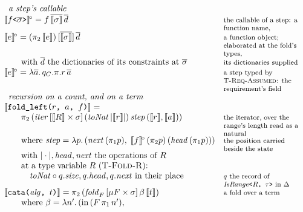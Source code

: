 \begin{figure}[htbp]
\[
\begin{array}{@{}l@{\quad}l@{}}
\multicolumn{2}{l}{\textit{a step's callable}} \\
\llbracket f\texttt{<}\overline{\sigma}\texttt{>} \rrbracket^{\!\circ} = f\,\overline{\llbracket \sigma \rrbracket}\,\overline{d} & \note{the callable of a step: a function name,} \\
\llbracket e \rrbracket^{\!\circ} = (\pi_2\,\llbracket e \rrbracket)\,[\overline{\llbracket \sigma \rrbracket}]\,\overline{d} & \note{a function object; elaborated at the fold's types,} \\
\qquad \text{with } \overline{d} \text{ the dictionaries of its constraints at } \overline{\sigma} & \note{its dictionaries supplied} \\
\llbracket e \rrbracket^{\!\circ} = \lambda\overline{a}.\,q_C.\pi.r\,\overline{a} & \note{a step typed by \textsc{T-Req-Assumed}: the requirement's field} \\
\multicolumn{2}{l}{\textit{recursion on a count, and on a term}} \\
\llbracket \texttt{fold\_left(}r\texttt{, }a\texttt{, }f\texttt{)} \rrbracket = {} & \\
\qquad \pi_2\,(\mathit{iter}\,[\llbracket R \rrbracket \times \sigma]\,(\mathit{toNat}\,|\llbracket r \rrbracket|)\,\mathit{step}\,(\llbracket r \rrbracket, \llbracket a \rrbracket)) & \note{the iterator, over the range's length read as a natural} \\
\qquad \text{where } \mathit{step} = \lambda p.\,(\mathit{next}\,(\pi_1 p),\; \llbracket f \rrbracket^{\!\circ}\,(\pi_2 p)\,(\mathit{head}\,(\pi_1 p))) & \note{the position carried beside the state} \\
\qquad \text{with } |\cdot|, \mathit{head}, \mathit{next} \text{ the operations of } R & \\
\qquad \text{at a type variable } R \text{ (\textsc{T-Fold-R}):} & \\
\qquad\quad \mathit{toNat} \circ q.\mathit{size}, q.\mathit{head}, q.\mathit{next} \text{ in their place} & \note{$q$  the record of $\mathit{IsRange}\texttt{<}R\texttt{, }\tau\texttt{>}$  in $\Delta$} \\
\llbracket \texttt{cata(}\mathit{alg}\texttt{, }t\texttt{)} \rrbracket = \pi_2\,(\mathit{fold}_F\,[\mu F \times \sigma]\,\beta\,\llbracket t \rrbracket) & \note{a fold over a term} \\
\qquad \text{where } \beta = \lambda n'.\,(\mathrm{in}\,(F\,\pi_1\,n'), & \\

\end{array}\]
\end{figure}
